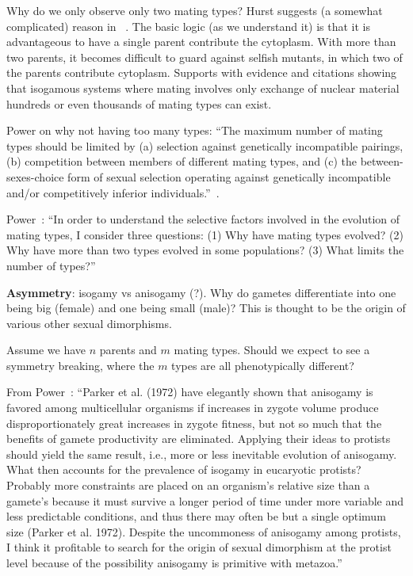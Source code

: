 Why do we only observe only two mating types?  Hurst suggests (a somewhat complicated) reason in ~\cite{hurst_why_1996}.  The basic logic (as we understand it) is that it is advantageous to have a single parent contribute the cytoplasm.  With more than two parents, it becomes difficult to guard against selfish mutants, in which two of the parents contribute cytoplasm.  Supports with evidence and citations showing that isogamous systems where mating involves only exchange of nuclear material hundreds or even thousands of mating types can exist.

Power on why not having too many types: ``The maximum number of mating types should be limited by (a) selection against genetically incompatible pairings, (b) competition between members of different mating types, and (c) the between-sexes-choice form of sexual selection operating against genetically incompatible and/or competitively inferior individuals.''~\cite{power_forces_1976}.

Power~\cite{power_forces_1976}: ``In order to understand the selective factors involved in the evolution of mating types, I consider three questions: (1) Why have mating types evolved? (2) Why have more than two types evolved in some populations? (3) What limits the number of types?''



\textbf{Asymmetry}: isogamy vs anisogamy (?). Why do gametes differentiate into one being big (female) and one being small (male)?  This is thought to be the origin of various other sexual dimorphisms.





Assume we have $n$ parents and $m$ mating types.  Should we expect to see a symmetry breaking, where the $m$ types are all phenotypically different?


From Power~\cite{power_forces_1976}: ``Parker et al. (1972) have elegantly shown that anisogamy is favored among multicellular organisms if increases in zygote volume produce disproportionately great increases in zygote fitness, but not so much that the benefits of gamete productivity are eliminated. Applying their ideas to protists should yield the same result, i.e., more or less inevitable evolution of anisogamy. What then accounts for the prevalence of isogamy in eucaryotic protists? Probably more constraints are placed on an organism's relative size than a gamete's because it must survive a longer period of time under more variable and less predictable conditions, and thus there may often be but a single optimum size (Parker et al. 1972). Despite the uncommoness of anisogamy among protists, I think it profitable to search for the origin of sexual dimorphism at the protist level because of the possibility anisogamy is primitive with metazoa.''

